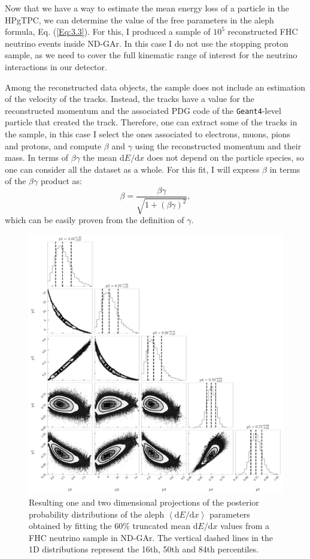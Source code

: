 Now that we have a way to estimate the mean energy loss of a particle in the HPgTPC, we can determine the value of the free parameters in the \gls{aleph} formula, Eq. (\ref{Eq:3.3}). For this, I produced a sample of $10^{5}$ reconstructed FHC neutrino events inside ND-GAr. In this case I do not use the stopping proton sample, as we need to cover the full kinematic range of interest for the neutrino interactions in our detector.

Among the reconstructed data objects, the sample does not include an estimation of the velocity of the tracks. Instead, the tracks have a value for the reconstructed momentum and the associated PDG code of the \texttt{Geant4}-level particle that created the track. Therefore, one can extract some of the tracks in the sample, in this case I select the ones associated to electrons, muons, pions and protons, and compute $\beta$ and $\gamma$ using the reconstructed momentum and their mass. In terms of $\beta\gamma$ the mean $\mathrm{d}E/\mathrm{d}x$ does not depend on the particle species, so one can consider all the dataset as a whole. For this fit, I will express $\beta$ in terms of the $\beta\gamma$ product as:
\begin{equation}
    \beta = \frac{\beta\gamma}{\sqrt{1+(\beta\gamma)^{2}}},
\end{equation}
which can be easily proven from the definition of $\gamma$.

\begin{figure}[t]
	\centering
	\includegraphics[width=.85\linewidth]{Images/GArSoft_PID/dEdx/mcmc_weighted_equal_frequency_bin_200.pdf}
	\caption[Resulting one and two dimensional projections of the posterior probability distributions of the \gls{aleph} $\left<\mathrm{d}E/\mathrm{d}x\right>$ parameters.]{Resulting one and two dimensional projections of the posterior probability distributions of the \gls{aleph} $\left<\mathrm{d}E/\mathrm{d}x\right>$ parameters obtained by fitting the $60\%$ truncated mean $\mathrm{d}E/\mathrm{d}x$ values from a FHC neutrino sample in ND-GAr. The vertical dashed lines in the 1D distributions represent the 16th, 50th and 84th percentiles.}
	\label{fig:dEdx_aleph_fit}
\end{figure}

